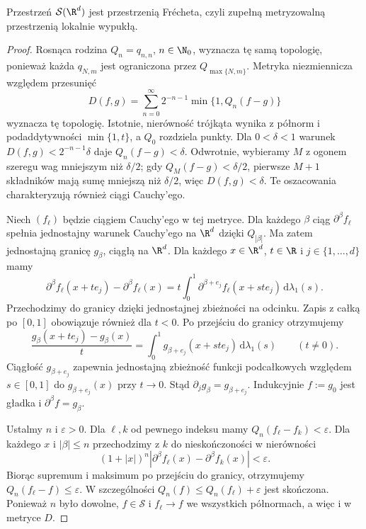 \begin{stwierdzenie}
Przestrzeń $\mathcal S(\R^d)$ jest przestrzenią Frécheta,
czyli zupełną metryzowalną przestrzenią lokalnie wypukłą.
\end{stwierdzenie}
\begin{proof}
Rosnąca rodzina $Q_n=q_{n,n}$, $n\in\N_0$, wyznacza
tę samą topologię, ponieważ każda $q_{N,m}$ jest
ograniczona przez $Q_{\max\{N,m\}}$.
Metryka niezmiennicza względem przesunięć
\[
 D(f,g)=\sum_{n=0}^{\infty}2^{-n-1}
 \min\{1,Q_n(f-g)\}
\]
wyznacza tę topologię. Istotnie, nierówność
trójkąta wynika z półnorm i podaddytywności
$\min\{1,t\}$, a $Q_0$ rozdziela punkty.
Dla $0<\delta<1$ warunek
$D(f,g)<2^{-n-1}\delta$ daje $Q_n(f-g)<\delta$.
Odwrotnie, wybieramy $M$ z ogonem szeregu wag
mniejszym niż $\delta/2$; gdy $Q_M(f-g)<\delta/2$,
pierwsze $M+1$ składników mają sumę mniejszą
niż $\delta/2$, więc $D(f,g)<\delta$.
Te oszacowania charakteryzują również ciągi Cauchy'ego.

Niech $(f_\ell)$ będzie ciągiem Cauchy'ego w tej
metryce. Dla każdego $\beta$ ciąg
$\partial^\beta f_\ell$ spełnia jednostajny
warunek Cauchy'ego na $\R^d$ dzięki $Q_{|\beta|}$.
Ma zatem jednostajną granicę $g_\beta$, ciągłą
na $\R^d$. Dla każdego $x\in\R^d$, $t\in\R$
i $j\in\{1,\ldots,d\}$ mamy
\[
 \partial^\beta f_\ell(x+te_j)-\partial^\beta f_\ell(x)
 =t\int_0^1\partial^{\beta+e_j}f_\ell(x+ste_j)
 \,\mathrm d\lambda_1(s).
\]
Przechodzimy do granicy dzięki jednostajnej zbieżności
na odcinku. Zapis z całką po $[0,1]$
obowiązuje również dla $t<0$.
Po przejściu do granicy otrzymujemy
\[
 \frac{g_\beta(x+te_j)-g_\beta(x)}{t}
 =\int_0^1g_{\beta+e_j}(x+ste_j)
 \,\mathrm d\lambda_1(s)\qquad(t\ne0).
\]
Ciągłość $g_{\beta+e_j}$ zapewnia jednostajną
zbieżność funkcji podcałkowych względem $s\in[0,1]$
do $g_{\beta+e_j}(x)$ przy $t\to0$.
Stąd $\partial_j g_\beta=g_{\beta+e_j}$.
Indukcyjnie $f:=g_0$ jest gładka i
$\partial^\beta f=g_\beta$.

Ustalmy $n$ i $\varepsilon>0$. Dla
$\ell,k$ od pewnego indeksu mamy
$Q_n(f_\ell-f_k)<\varepsilon$. Dla każdego
$x$ i $|\beta|\le n$ przechodzimy z $k$
do nieskończoności w nierówności
\[
 (1+|x|)^n|\partial^\beta f_\ell(x)
              -\partial^\beta f_k(x)|<\varepsilon.
\]
Biorąc supremum i maksimum po przejściu do
granicy, otrzymujemy $Q_n(f_\ell-f)\le\varepsilon$.
W szczególności $Q_n(f)\le Q_n(f_\ell)+\varepsilon$
jest skończona. Ponieważ $n$ było dowolne,
$f\in\mathcal S$ i $f_\ell\to f$ we wszystkich
półnormach, a więc i w metryce $D$.
\end{proof}

